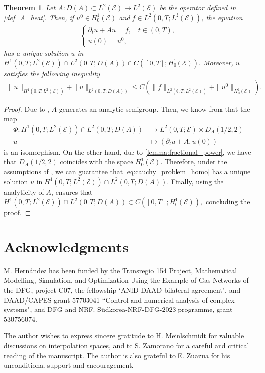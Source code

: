 \documentclass[a4paper, 10pt, english]{article}
\def\to{\rightarrow}
\newtheorem{theorem}{Theorem}[section]
\begin{document}
\begin{theorem}\label{th:maximal_regularity}
Let $A:D(A)\subset L^2(\mathcal{E})\to L^2(\mathcal{E})$ be the operator defined in \eqref{def_A_heat}. Then, if $u^0\in H^1_0(\mathcal{E})$ and $f\in L^2(0,T;L^2(\mathcal{E}))$, the equation 
\begin{align}\label{eq:cauchy_problem_homo}
    \begin{cases}
        \partial_t u + Au = f, \quad t\in (0,T),\\
    u(0)=u^0,
    \end{cases}
\end{align}
has a unique solution $u$ in $ H^1(0,T;L^2(\mathcal{E}))\cap L^2(0,T;D(A))\cap C([0, T]; H_0^1(\mathcal{E})).$ Moreover, $u$ satisfies the following inequality
\begin{align*}
        \|u\|_{H^1(0, T; L^2(\mathcal{E}))} + \|u\|_{L^2(0, T; D(A))} \leq C \left( \|f\|_{L^2(0, T; L^2(\mathcal{E}))} + \|u^0\|_{H^1_0(\mathcal{E})} \right).
    \end{align*} 
\end{theorem}
\begin{proof}
    Due to , $A$ generates an analytic semigroup. Then, we know from \cite[Theorem 3.1]{Bensoussan} that the map 
    \begin{align*}
    \Phi:H^1(0,T;L^2(\mathcal{E}))\cap L^2(0,T;D(A))& \to  L^2(0,T;\mathcal{E})\times D_A(1/2,2)\\
    u&\mapsto (\partial_t u +A,u(0))
    \end{align*}
    is an isomorphism. On the other hand, due to \cref{lemma:fractional_power}, we have that $D_{A}(1/2,2)$ coincides with the space $H^1_{0}(\mathcal{E})$. Therefore, under the assumptions of , we can guarantee that  \eqref{eq:cauchy_problem_homo} has a unique solution $u$ in   $H^1(0,T;L^2(\mathcal{E}))\cap L^2(0,T;D(A))$. Finally, using the analyticity of $A$, \cite[Remark 4.2]{Bensoussan} ensures that $H^1(0,T;L^2(\mathcal{E}))\cap L^2(0,T;D(A))\subset C([0, T]; H_0^1(\mathcal{E})),$ concluding the proof.

\end{proof}




	\vspace{5mm}
	\section*{Acknowledgments}
M. Hern\'{a}ndez has been funded by the Transregio 154 Project, Mathematical Modelling, Simulation, and Optimization Using the Example of Gas Networks of the DFG, project C07, the fellowship `ANID-DAAD bilateral agreement", and DAAD/CAPES grant 57703041 ``Control and numerical analysis of complex systems", and  DFG and NRF. Südkorea-NRF-DFG-2023 programme, grant 530756074.

The author wishes to express sincere gratitude to H. Meinlschmidt for valuable discussions on interpolation spaces, and to S. Zamorano for a careful and critical reading of the manuscript. The author is also grateful to E. Zuazua for his unconditional support and encouragement.
	 
	
	
	
	
\end{document}
